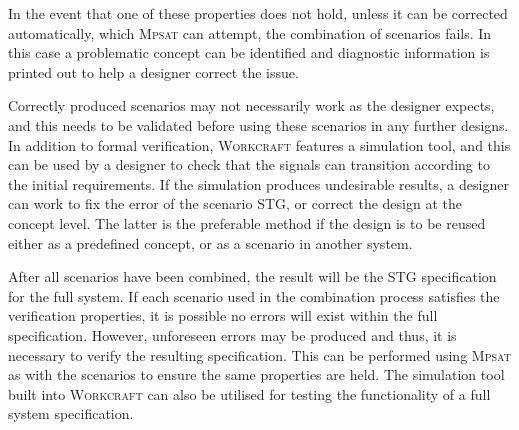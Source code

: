 \documentclass[british, journal]{IEEEtran}
\newcommand{\noun}[1]{\textsc{#1}}
\begin{document}
In the event that one of these properties does not hold, unless it can be corrected
automatically, which \noun{Mpsat} can attempt, the combination of scenarios fails.
In this case a problematic concept can be identified and diagnostic information
is printed out to help a designer correct the issue.

Correctly produced scenarios may not necessarily work as the designer expects,
and this needs to be validated before using these scenarios
in any further designs. In addition to formal verification, \noun{Workcraft}
features a simulation tool,
and this can be used by a designer to check that the signals can transition
according to the initial requirements. If the simulation produces
undesirable results, a designer can work to fix the error of the scenario
STG, or correct the design at the concept level. The latter is the
preferable method if the design is to be reused either as a predefined
concept, or as a scenario in another system.

After all scenarios have been combined, the result will be the STG specification
for the full system. If each scenario used in the combination process satisfies
the verification properties, it is possible no errors will exist within the full
specification. However,  unforeseen errors may be produced
and thus, it is necessary to verify the resulting specification. This can
be performed using \noun{Mpsat} as with the scenarios to ensure the same
properties are held. The simulation tool built into \noun{Workcraft} can also
be utilised for testing the functionality of a full system specification.

%
%
\end{document}
